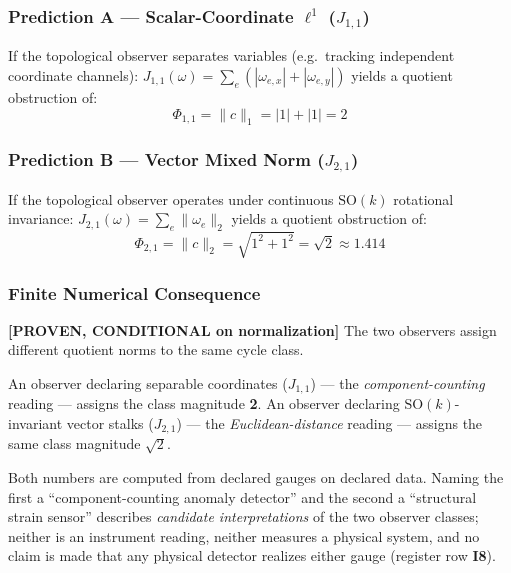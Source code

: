 \documentclass[
  11pt,
]{article}
\begin{document}
\subsubsection{\texorpdfstring{Prediction A --- Scalar-Coordinate
\(\ell^1\)
(\(J_{1,1}\))}{Prediction A --- Scalar-Coordinate \textbackslash ell\^{}1 (J\_\{1,1\})}}\label{prediction-a-scalar-coordinate-ell1-j_11}

If the topological observer separates variables (e.g.~tracking
independent coordinate channels):
\(J_{1,1}(\omega) = \sum_e (|\omega_{e,x}| + |\omega_{e,y}|)\) yields a
quotient obstruction of: \[\Phi_{1,1} = \|c\|_1 = |1| + |1| = 2\]

\subsubsection{\texorpdfstring{Prediction B --- Vector Mixed Norm
(\(J_{2,1}\))}{Prediction B --- Vector Mixed Norm (J\_\{2,1\})}}\label{prediction-b-vector-mixed-norm-j_21}

If the topological observer operates under continuous \(\mathrm{SO}(k)\)
rotational invariance: \(J_{2,1}(\omega) = \sum_e \|\omega_e\|_2\)
yields a quotient obstruction of:
\[\Phi_{2,1} = \|c\|_2 = \sqrt{1^2 + 1^2} = \sqrt{2} \approx 1.414\]

\subsubsection{Finite Numerical
Consequence}\label{finite-numerical-consequence}

\textbf{{[}PROVEN, CONDITIONAL on normalization{]}} The two observers
assign different quotient norms to the same cycle class.

An observer declaring separable coordinates (\(J_{1,1}\)) --- the
\emph{component-counting} reading --- assigns the class magnitude
\textbf{2}. An observer declaring \(\mathrm{SO}(k)\)-invariant vector
stalks (\(J_{2,1}\)) --- the \emph{Euclidean-distance} reading ---
assigns the same class magnitude \textbf{\(\sqrt{2}\)}.

Both numbers are computed from declared gauges on declared data. Naming
the first a ``component-counting anomaly detector'' and the second a
``structural strain sensor'' describes \emph{candidate interpretations}
of the two observer classes; neither is an instrument reading, neither
measures a physical system, and no claim is made that any physical
detector realizes either gauge (register row \textbf{I8}).
\end{document}
